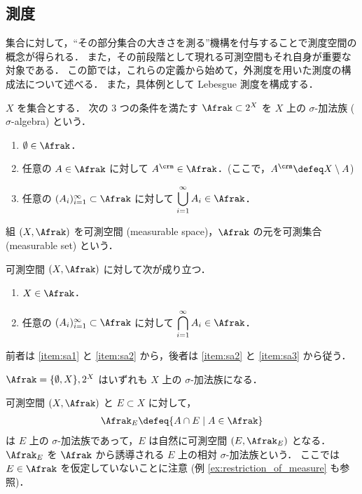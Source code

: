 \subsection{測度}

集合に対して，``その部分集合の大きさを測る''機構を付与することで測度空間の概念が得られる．
また，その前段階として現れる可測空間もそれ自身が重要な対象である．
この節では，これらの定義から始めて，外測度を用いた測度の構成法について述べる．
また，具体例として Lebesgue 測度を構成する．

\begin{definition}
    $X$ を集合とする．
    次の $3$ つの条件を満たす $\Afrak\subset2^X$ を $X$ 上の $\sigma$-加法族 ($\sigma$-algebra) という．
    \begin{enumerate}[label=\textsf{(SA\arabic*)},align=left]
        \item\label{item:sa1} $\emptyset\in\Afrak$．
        \item\label{item:sa2} 任意の $A\in\Afrak$ に対して $A^\crm\in\Afrak$．\quad (ここで，$A^\crm\defeq X\setminus A$)
        \item\label{item:sa3} 任意の $(A_i)_{i=1}^\infty\subset\Afrak$ に対して $\displaystyle\bigcup_{i=1}^\infty A_i\in\Afrak$．
    \end{enumerate}
    組 $(X,\Afrak)$ を可測空間 (measurable space)，$\Afrak$ の元を可測集合 (measurable set) という．
\end{definition}

\begin{remark}
    可測空間 $(X,\Afrak)$ に対して次が成り立つ．
    \begin{enumerate}
        \item $X\in\Afrak$．
        \item 任意の $(A_i)_{i=1}^\infty\subset\Afrak$ に対して $\displaystyle\bigcap_{i=1}^\infty A_i\in\Afrak$．
    \end{enumerate}
    前者は \ref{item:sa1} と \ref{item:sa2} から，後者は \ref{item:sa2} と \ref{item:sa3} から従う．
\end{remark}

\begin{example}
    $\Afrak=\{\emptyset,X\},2^X$ はいずれも $X$ 上の $\sigma$-加法族になる．
\end{example}

\begin{example}\label{ex:relative_sigma_algebra}
    可測空間 $(X,\Afrak)$ と $E\subset X$ に対して，
    \begin{align*}
        \Afrak_E\defeq\{A\cap E\mid A\in\Afrak\}
    \end{align*}
    は $E$ 上の $\sigma$-加法族であって，$E$ は自然に可測空間 $(E,\Afrak_E)$ となる．
    $\Afrak_E$ を $\Afrak$ から誘導される $E$ 上の相対 $\sigma$-加法族という．
    ここでは $E\in\Afrak$ を仮定していないことに注意 (例 \ref{ex:restriction_of_measure} も参照)．
\end{example}

